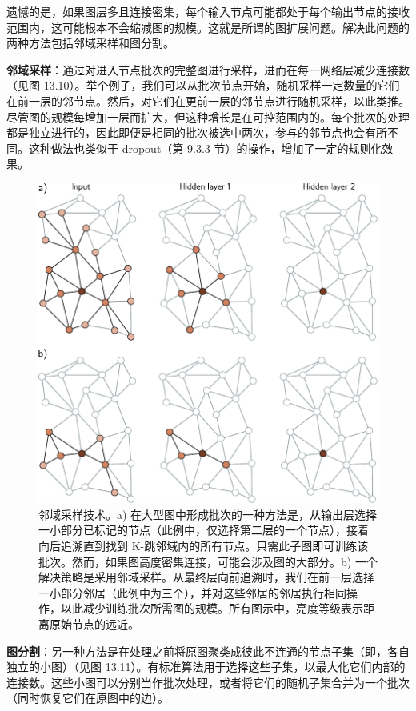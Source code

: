 \documentclass[lang=cn,newtx,10pt,scheme=chinese]{elegantbook}
\begin{document}
遗憾的是，如果图层多且连接密集，每个输入节点可能都处于每个输出节点的接收范围内，这可能根本不会缩减图的规模。这就是所谓的图扩展问题。解决此问题的两种方法包括邻域采样和图分割。

\textbf{邻域采样}：通过对进入节点批次的完整图进行采样，进而在每一网络层减少连接数（见图 13.10）。举个例子，我们可以从批次节点开始，随机采样一定数量的它们在前一层的邻节点。然后，对它们在更前一层的邻节点进行随机采样，以此类推。尽管图的规模每增加一层而扩大，但这种增长是在可控范围内的。每个批次的处理都是独立进行的，因此即便是相同的批次被选中两次，参与的邻节点也会有所不同。这种做法也类似于 dropout（第 9.3.3 节）的操作，增加了一定的规则化效果。

\begin{figure}[ht!]
\centering
\includegraphics[width=0.7\linewidth]{PDFFigures/UDLChap13PDF/GraphSampling.pdf}
\caption{邻域采样技术。a) 在大型图中形成批次的一种方法是，从输出层选择一小部分已标记的节点（此例中，仅选择第二层的一个节点），接着向后追溯直到找到 K-跳邻域内的所有节点。只需此子图即可训练该批次。然而，如果图高度密集连接，可能会涉及图的大部分。b) 一个解决策略是采用邻域采样。从最终层向前追溯时，我们在前一层选择一小部分邻居（此例中为三个），并对这些邻居的邻居执行相同操作，以此减少训练批次所需图的规模。所有图示中，亮度等级表示距离原始节点的远近。}
\end{figure}


\textbf{图分割}：另一种方法是在处理之前将原图聚类成彼此不连通的节点子集（即，各自独立的小图）（见图 13.11）。有标准算法用于选择这些子集，以最大化它们内部的连接数。这些小图可以分别当作批次处理，或者将它们的随机子集合并为一个批次（同时恢复它们在原图中的边）。
\end{document}
